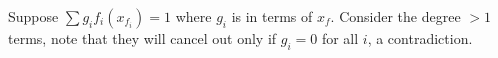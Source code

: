 Suppose $\sum g_i f_i(x_{f_i})=1$ where $g_i$ is in terms of $x_f$. Consider the degree $>1$ terms, note that they will cancel out only if $g_i=0$ for all $i$, a contradiction.
